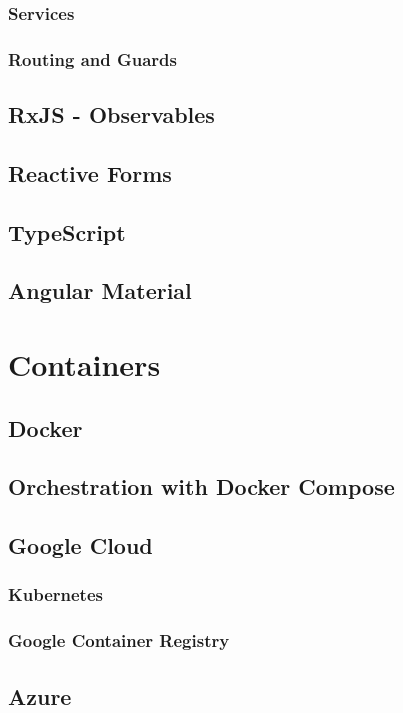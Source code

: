 \documentclass[11pt,a4paper]{report}
\begin{document}
\subsubsection{Services}
\subsubsection{Routing and Guards}
\subsection{RxJS - Observables}
\subsection{Reactive Forms}
\subsection{TypeScript}
\subsection{Angular Material}
\section{Containers}
\subsection{Docker}
\subsection{Orchestration with Docker Compose}
\subsection{Google Cloud}
\subsubsection{Kubernetes}
\subsubsection{Google Container Registry}
\subsection{Azure}
\end{document}
